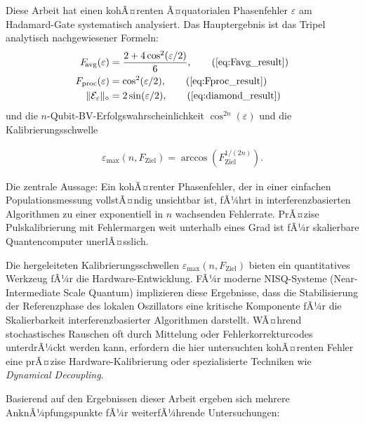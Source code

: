 ﻿\documentclass[11pt,a4paper]{article}
\theoremstyle{definition}
\newcommand{\eps}{\varepsilon}
\newcommand{\Fav}{F_{\!\mathrm{avg}}}
\newcommand{\Fdiam}{\|\mathcal{E}_\eps\|_\diamond}
\begin{document}
Diese Arbeit hat einen kohÃ¤renten Ã¤quatorialen Phasenfehler $\eps$ am
Hadamard-Gate systematisch analysiert.  Das Hauptergebnis ist das Tripel
analytisch nachgewiesener Formeln:
\begin{align}
  \Fav(\eps) &= \frac{2 + 4\cos^2(\eps/2)}{6}, \tag{\ref{eq:Favg_result}}\\
  F_{\mathrm{proc}}(\eps) &= \cos^2(\eps/2), \tag{\ref{eq:Fproc_result}}\\
  \Fdiam &= 2\sin(\eps/2), \tag{\ref{eq:diamond_result}}
\end{align}
und die $n$-Qubit-BV-Erfolgswahrscheinlichkeit $\cos^{2n}(\eps)$ und die
Kalibrierungsschwelle 

\begin{align}
  \eps_{\max}(n, F_{\mathrm{Ziel}}) = \arccos(F_{\mathrm{Ziel}}^{1/(2n)}).
\end{align}

Die zentrale Aussage: Ein kohÃ¤renter Phasenfehler, der in einer einfachen
Populationsmessung vollstÃ¤ndig unsichtbar ist, fÃ¼hrt in interferenzbasierten
Algorithmen zu einer exponentiell in $n$ wachsenden Fehlerrate.
PrÃ¤zise Pulskalibrierung mit Fehlermargen weit unterhalb eines Grad ist fÃ¼r
skalierbare Quantencomputer unerlÃ¤sslich.

Die hergeleiteten Kalibrierungsschwellen $\eps_{\max}(n, F_{\mathrm{Ziel}})$ bieten ein quantitatives Werkzeug fÃ¼r die Hardware-Entwicklung. FÃ¼r moderne NISQ-Systeme (Near-Intermediate Scale Quantum) implizieren diese Ergebnisse, dass die Stabilisierung der Referenzphase des lokalen Oszillators eine kritische Komponente fÃ¼r die Skalierbarkeit interferenzbasierter Algorithmen darstellt. WÃ¤hrend stochastisches Rauschen oft durch Mittelung oder Fehlerkorrekturcodes unterdrÃ¼ckt werden kann, erfordern die hier untersuchten kohÃ¤renten Fehler eine prÃ¤zise Hardware-Kalibrierung oder spezialisierte Techniken wie \emph{Dynamical Decoupling}.

Basierend auf den Ergebnissen dieser Arbeit ergeben sich mehrere AnknÃ¼pfungspunkte fÃ¼r weiterfÃ¼hrende Untersuchungen:
\end{document}
